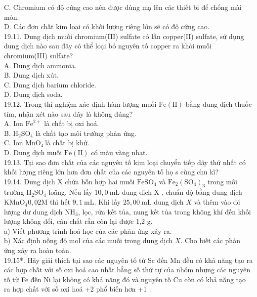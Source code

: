 \documentclass[10pt]{article}
\begin{document}
C. Chromium có độ cứng cao nên được dùng mạ lên các thiết bị để chống mài mòn.\\
D. Các đơn chất kim loại có khối lượng riêng lớn sẽ có độ cứng cao.\\
19.11. Dung dịch muối chromium(III) sulfate có lẫn copper(II) sulfate, sử dụng dung dịch nào sau đây có thể loại bỏ nguyên tố copper ra khỏi muối chromium(III) sulfate?\\
A. Dung dịch ammonia.\\
B. Dung dịch xút.\\
C. Dung dịch barium chloride.\\
D. Dung dịch soda.\\
19.12. Trong thí nghiệm xác định hàm lượng muối $\mathrm{Fe}(\mathrm{II})$ bằng dung dịch thuốc tím, nhận xét nào sau đây là không đúng?\\
A. Ion $\mathrm{Fe}^{2+}$ là chất bị oxi hoá.\\
B. $\mathrm{H}_{2} \mathrm{SO}_{4}$ là chất tạo môi trường phản ứng.\\
C. Ion $\mathrm{MnO}_{4}^{-}$là chất bị khử.\\
D. Dung dịch muối $\mathrm{Fe}(\mathrm{II})$ có màu vàng nhạt.\\
19.13. Tại sao đơn chất của các nguyên tố kim loại chuyển tiếp dãy thứ nhất có khối lượng riêng lớn hơn đơn chất của các nguyên tố họ s cùng chu kì?\\
19.14. Dung dịch X chứa hỗn hợp hai muối $\mathrm{FeSO}_{4}$ và $\mathrm{Fe}_{2}\left(\mathrm{SO}_{4}\right)_{3}$ trong môi trường $\mathrm{H}_{2} \mathrm{SO}_{4}$ loãng. Nếu lấy $10,0 \mathrm{~mL}$ dung dịch X , chuẩn độ bằng dung dịch $\mathrm{KMnO}_{4} 0,02 \mathrm{M}$ thì hết $9,1 \mathrm{~mL}$. Khi lấy $25,00 \mathrm{~mL}$ dung dịch $X$ và thêm vào đó lượng dư dung dịch $\mathrm{NH}_{3}$, lọc, rửa kết tủa, nung kết tủa trong không khí đến khối lượng không đổi, cân chất rắn còn lại được 1,2 g.\\
a) Viết phương trình hoá học của các phản ứng xảy ra.\\
b) Xác định nồng độ mol của các muối trong dung dịch $X$. Cho biết các phản ứng xảy ra hoàn toàn.\\
19.15*. Hãy giải thích tại sao các nguyên tố từ Sc đến Mn đều có khả năng tạo ra các hợp chất với số oxi hoá cao nhất bằng số thứ tự của nhóm nhưng các nguyên tố từ Fe đến Ni lại không có khả năng đó và nguyên tố Cu còn có khả năng tạo ra hợp chất với số oxi hoá +2 phổ biến hơn +1 .\\
\end{document}
